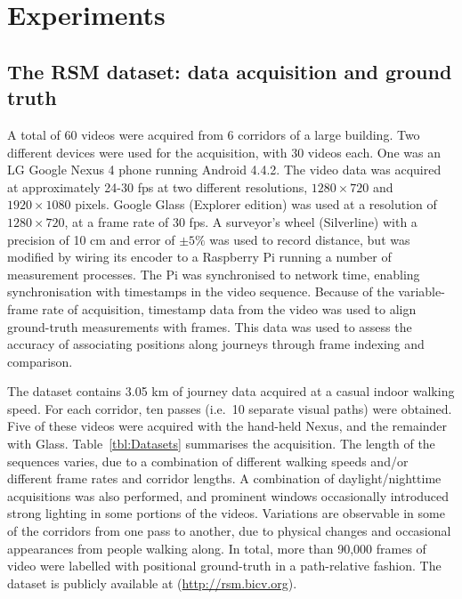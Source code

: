 \section{Experiments}
\label{sec:exp_methods}

\subsection{The RSM dataset: data acquisition and ground truth}
\label{sec:Dataset}

A total of 60 videos were acquired from 6 corridors of a large building.  Two different devices were used for the acquisition, with 30 videos each. One was an LG Google Nexus 4 phone running Android 4.4.2.  The video data was acquired at approximately 24-30 fps at two different resolutions, $1280 \times 720$ and $1920\times 1080$ pixels.  Google Glass (Explorer edition) was used at a resolution of $1280 \times 720$, at a frame rate of 30 fps.  A surveyor's wheel (Silverline) with a precision of 10 cm and error of $\pm 5\%$ was used to record distance, but was modified by wiring its encoder to a Raspberry Pi running a number of measurement processes.  The Pi was synchronised to network time, enabling synchronisation with timestamps in the video sequence.  Because of the variable-frame rate of acquisition, timestamp data from the video was used to align ground-truth measurements with frames. This data was used to assess the accuracy of associating positions along journeys through frame indexing and comparison.

The dataset contains 3.05 km of journey data acquired at a casual indoor walking speed.  For each corridor, ten passes (i.e.\ 10 separate visual paths) were obtained. Five of these videos were acquired with the hand-held Nexus, and the remainder with Glass.  Table~\ref{tbl:Datasets} summarises the acquisition.  The length of the sequences varies, due to a combination of different walking speeds and/or different frame rates and corridor lengths. A combination of daylight/nighttime acquisitions was also performed, and prominent windows occasionally introduced strong lighting in some portions of the videos.  Variations are observable in some of the corridors from one pass to another, due to physical changes and occasional appearances from people walking along. In total, more than 90,000 frames of video were labelled with positional ground-truth in a path-relative fashion. The dataset is publicly available  at \citep{Rivera-Rubio2014} (\url{http://rsm.bicv.org}).

